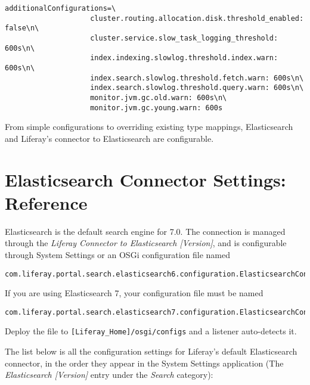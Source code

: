 \begin{verbatim}
additionalConfigurations=\
                    cluster.routing.allocation.disk.threshold_enabled: false\n\
                    cluster.service.slow_task_logging_threshold: 600s\n\
                    index.indexing.slowlog.threshold.index.warn: 600s\n\
                    index.search.slowlog.threshold.fetch.warn: 600s\n\
                    index.search.slowlog.threshold.query.warn: 600s\n\
                    monitor.jvm.gc.old.warn: 600s\n\
                    monitor.jvm.gc.young.warn: 600s
\end{verbatim}

From simple configurations to overriding existing type mappings,
Elasticsearch and Liferay's connector to Elasticsearch are configurable.

\chapter{Elasticsearch Connector Settings:
Reference}\label{elasticsearch-connector-settings-reference}

Elasticsearch is the default search engine for 7.0. The connection is
managed through the \emph{Liferay Connector to Elasticsearch
{[}Version{]}}, and is configurable through System Settings or an OSGi
configuration file named

\begin{verbatim}
com.liferay.portal.search.elasticsearch6.configuration.ElasticsearchConfiguration.config
\end{verbatim}

If you are using Elasticsearch 7, your configuration file must be named

\begin{verbatim}
com.liferay.portal.search.elasticsearch7.configuration.ElasticsearchConfiguration.config
\end{verbatim}

Deploy the file to \texttt{{[}Liferay\_Home{]}/osgi/configs} and a
listener auto-detects it.

The list below is all the configuration settings for Liferay's default
Elasticsearch connector, in the order they appear in the System Settings
application (The \emph{Elasticsearch {[}Version{]}} entry under the
\emph{Search} category):

